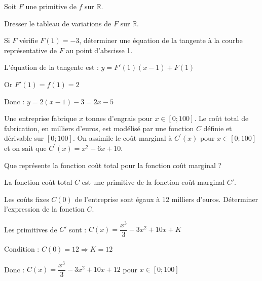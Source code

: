 \documentclass[11pt,a4paper]{article}  %
\begin{document}
Soit $F$ une primitive de $f$ sur $\mathbb{R}$.
\begin{enumMet}
	\item Dresser le tableau de variations de $F$ sur $\mathbb{R}$.
	\begin{corrBox}
	\end{corrBox}
	\item Si $F$ vérifie $F(1)=-3$, déterminer une équation de la tangente à la courbe représentative de $F$ au point d'abscisse 1.
	\begin{corrBox}
		L'équation de la tangente est : $y = F'(1)(x-1) + F(1)$
		
		Or $F'(1) = f(1) = 2$
		
		Donc : $y = 2(x-1)-3=2x-5$
	\end{corrBox}
\end{enumMet}

\vspace*{-0.5cm}
\exerciceDS{}

Une entreprise fabrique $x$ tonnes d'engrais pour $x \in[0 ; 100]$. Le coût total de fabrication, en milliers d'euros, est modélisé par une fonction $C$ définie et dérivable sur $[0 ; 100]$. On assimile le coût marginal à $C^{\prime}(x)$ pour $x \in[0 ; 100]$ et on sait que $C^{\prime}(x)=x^2-6 x+10$.
\begin{enumMet}
	\item Que représente la fonction coût total pour la fonction coût marginal ?
	\begin{corrBox}
		La fonction coût total $C$ est une primitive de la fonction coût marginal $C'$.
	\end{corrBox}
	\item Les coûts fixes $C(0)$ de l'entreprise sont égaux à 12 milliers d'euros. Déterminer l'expression de la fonction $C$.
	\begin{corrBox}
		Les primitives de $C'$ sont : $C(x) = \dfrac{x^3}{3} - 3x^2 + 10x + K$
		
		Condition : $C(0) = 12 \Rightarrow K = 12$
		
		Donc : $C(x) = \dfrac{x^3}{3} - 3x^2 + 10x + 12$ pour $x \in [0; 100]$
	\end{corrBox}
\end{enumMet}
\end{document}
